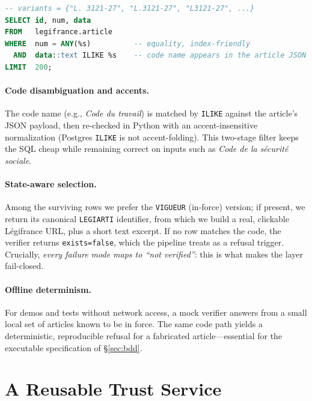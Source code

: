 \documentclass[sigconf, nonacm]{acmart}
\begin{document}
\begin{lstlisting}[style=lr, language=SQL]
-- variants = {"L. 3121-27", "L.3121-27", "L3121-27", ...}
SELECT id, num, data
FROM   legifrance.article
WHERE  num = ANY(%s)          -- equality, index-friendly
  AND  data::text ILIKE %s    -- code name appears in the article JSON
LIMIT  200;
\end{lstlisting}

\paragraph{Code disambiguation and accents.}
The code name (e.g., \emph{Code du travail}) is matched by \texttt{ILIKE}
against the article's JSON payload, then re-checked in Python with an
accent-insensitive normalization (Postgres \texttt{ILIKE} is not
accent-folding). This two-stage filter keeps the SQL cheap while remaining
correct on inputs such as \emph{Code de la s\'ecurit\'e sociale}.

\paragraph{State-aware selection.}
Among the surviving rows we prefer the \texttt{VIGUEUR} (in-force) version;
if present, we return its canonical \texttt{LEGIARTI} identifier, from which we
build a real, clickable Légifrance URL, plus a short text excerpt. If no row
matches the code, the verifier returns \texttt{exists=false}, which the
pipeline treats as a refusal trigger. Crucially, \emph{every failure mode maps
to ``not verified''}: this is what makes the layer fail-closed.

\paragraph{Offline determinism.}
For demos and tests without network access, a mock verifier answers from a
small local set of articles known to be in force. The same code path yields a
deterministic, reproducible refusal for a fabricated article---essential for
the executable specification of \S\ref{sec:bdd}.

\section{A Reusable Trust Service}
\label{sec:service}
\end{document}
